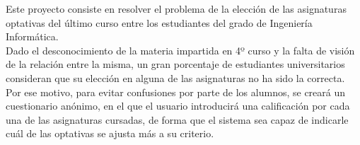 \newcommand{\grad}{$^{\circ}$}
\nonzeroparskip
Este proyecto consiste en resolver el problema de la elección de las asignaturas optativas del último curso entre los estudiantes del grado de Ingeniería Informática. \\

Dado el desconocimiento de la materia impartida en 4º curso y la falta de visión de la relación entre la misma, un gran porcentaje de estudiantes universitarios consideran que su elección en alguna de las asignaturas no ha sido la correcta. \\

Por ese motivo, para evitar confusiones por parte de los alumnos, se creará un cuestionario anónimo, en el que el usuario introducirá una calificación por cada una de las asignaturas cursadas, de forma que el sistema sea capaz de indicarle cuál de las optativas se ajusta más a su criterio. 